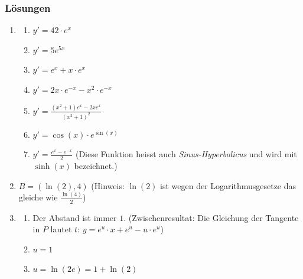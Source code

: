 \subsubsection*{Lösungen}
\begin{enumerate}
    \item
          \begin{enumerate}
              \item $y'= 42\cdot e^x$
              \item $y'= 5e^{5x}$
              \item $y'= e^x + x\cdot e^x$
              \item $y'= 2x\cdot e^{-x} - x^2 \cdot e^{-x}$
              \item $y' = \frac{(x^2+1)e^x-2xe^x}{(x^2+1)^2}$
              \item $y' = \cos(x) \cdot e^{\sin(x)}$
              \item $y' = \frac{e^x-e^{-x}}{2}$ (Diese Funktion heisst auch \emph{Sinus-Hyperbolicus} und wird mit $\sinh(x)$ bezeichnet.)
          \end{enumerate}
    \item $B=(\ln(2), 4)$ (Hinweis: $\ln(2)$ ist wegen der Logarithmusgesetze das gleiche wie $\frac{\ln(4)}{2}$)

    \item
          \begin{enumerate}
              \item Der Abstand ist immer $1$. (Zwischenresultat: Die Gleichung der Tangente in $P$ lautet $t: \, y = e^u \cdot x + e^u - u\cdot e^u$)
              \item $u=1$
              \item $u = \ln(2e) = 1+\ln(2)$
          \end{enumerate}
\end{enumerate}


































